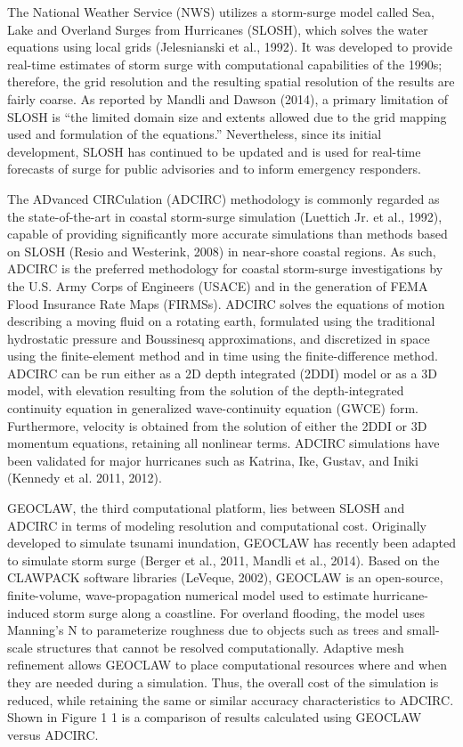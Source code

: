 The National Weather Service (NWS) utilizes a storm-surge model called Sea, Lake and Overland Surges from Hurricanes (SLOSH), which solves the water equations using local grids (Jelesnianski et al., 1992). It was developed to provide real-time estimates of storm surge with computational capabilities of the 1990s; therefore, the grid resolution and the resulting spatial resolution of the results are fairly coarse. As reported by Mandli and Dawson (2014), a primary limitation of SLOSH is “the limited domain size and extents allowed due to the grid mapping used and formulation of the equations.” Nevertheless, since its initial development, SLOSH has continued to be updated and is used for real-time forecasts of surge for public advisories and to inform emergency responders.

The ADvanced CIRCulation (ADCIRC) methodology is commonly regarded as the state-of-the-art in coastal storm-surge simulation (Luettich Jr. et al., 1992), capable of providing significantly more accurate simulations than methods based on SLOSH (Resio and Westerink, 2008) in near-shore coastal regions. As such, ADCIRC is the preferred methodology for coastal storm-surge investigations by the U.S. Army Corps of Engineers (USACE) and in the generation of FEMA Flood Insurance Rate Maps (FIRMSs). ADCIRC solves the equations of motion describing a moving fluid on a rotating earth, formulated using the traditional hydrostatic pressure and Boussinesq approximations, and discretized in space using the finite-element method and in time using the finite-difference method. ADCIRC can be run either as a 2D depth integrated (2DDI) model or as a 3D model, with elevation resulting from the solution of the depth-integrated continuity equation in generalized wave-continuity equation (GWCE) form. Furthermore, velocity is obtained from the solution of either the 2DDI or 3D momentum equations, retaining all nonlinear terms. ADCIRC simulations have been validated for major hurricanes such as Katrina, Ike, Gustav, and Iniki (Kennedy et al. 2011, 2012). 

GEOCLAW, the third computational platform, lies between SLOSH and ADCIRC in terms of modeling resolution and computational cost. Originally developed to simulate tsunami inundation, GEOCLAW has recently been adapted to simulate storm surge (Berger et al., 2011, Mandli et al., 2014). Based on the CLAWPACK software libraries (LeVeque, 2002), GEOCLAW is an open-source, finite-volume, wave-propagation numerical model used to estimate hurricane-induced storm surge along a coastline. For overland flooding, the model uses Manning's N to parameterize roughness due to objects such as trees and small-scale structures that cannot be resolved computationally. Adaptive mesh refinement allows GEOCLAW to place computational resources where and when they are needed during a simulation. Thus, the overall cost of the simulation is reduced, while retaining the same or similar accuracy characteristics to ADCIRC. Shown in Figure 1 1 is a comparison of results calculated using GEOCLAW versus ADCIRC. 
\newline

